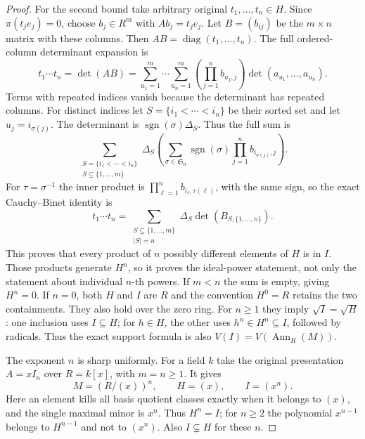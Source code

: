 \begin{proof}
For the second bound take arbitrary original
$t_1,\ldots,t_n\in H$. Since $\pi(t_je_j)=0$,
choose $b_j\in R^m$ with $Ab_j=t_je_j$.
Let $B=(b_{ij})$ be the $m\times n$ matrix with these
columns. Then $AB=\operatorname{diag}(t_1,\ldots,t_n)$.
The full ordered-column determinant expansion is
$$
t_1\cdots t_n=\det(AB)
=\sum_{u_1=1}^m\cdots\sum_{u_n=1}^m
\left(\prod_{j=1}^n b_{u_j,j}\right)
\det(a_{u_1},\ldots,a_{u_n}).
$$
Terms with repeated indices vanish because the determinant
has repeated columns. For distinct indices let
$S=\{i_1<\cdots<i_n\}$ be their sorted set and let
$u_j=i_{\sigma(j)}$. The determinant is
$\operatorname{sgn}(\sigma)\Delta_S$. Thus the full sum is
$$
\sum_{\substack{S=\{i_1<\cdots<i_n\}\\S\subseteq\{1,\ldots,m\}}}
\Delta_S
\left(\sum_{\sigma\in\mathfrak S_n}
\operatorname{sgn}(\sigma)\prod_{j=1}^n b_{i_{\sigma(j)},j}\right).
$$
For $\tau=\sigma^{-1}$ the inner product is
$\prod_{\ell=1}^n b_{i_\ell,\tau(\ell)}$, with the same
sign, so the exact Cauchy--Binet identity is
$$
t_1\cdots t_n
=\sum_{\substack{S\subseteq\{1,\ldots,m\}\\|S|=n}}
\Delta_S\det(B_{S,\{1,\ldots,n\}}).
$$
This proves that every product of $n$ possibly different
elements of $H$ is in $I$. Those products generate $H^n$,
so it proves the ideal-power statement, not only the
statement about individual $n$-th powers. If $m<n$
the sum is empty, giving $H^n=0$. If $n=0$, both $H$
and $I$ are $R$ and the convention $H^0=R$ retains the
two containments. They also hold over the zero ring.
For $n\geq1$ they imply $\sqrt I=\sqrt H$: one inclusion
uses $I\subseteq H$; for $h\in H$, the other uses
$h^n\in H^n\subseteq I$, followed by radicals.
Thus the exact support formula is also
$V(I)=V(\operatorname{Ann}_R(M))$.

The exponent $n$ is sharp uniformly. For a field $k$
take the original presentation $A=xI_n$ over $R=k[x]$,
with $m=n\geq1$. It gives
$$
M=(R/(x))^n,\qquad H=(x),\qquad I=(x^n).
$$
Here an element kills all basis quotient classes exactly
when it belongs to $(x)$, and the single maximal minor
is $x^n$. Thus $H^n=I$; for $n\geq2$ the polynomial
$x^{n-1}$ belongs to $H^{n-1}$ and not to $(x^n)$.
Also $I\subsetneq H$ for these $n$.


\end{proof}
